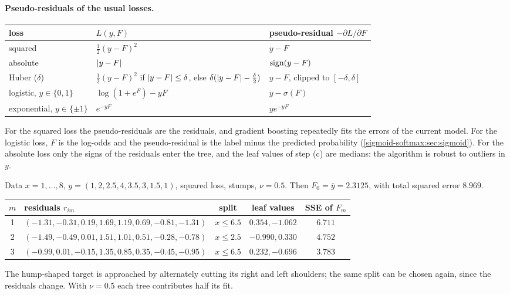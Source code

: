 \begin{notechapter}
\paragraph{Pseudo-residuals of the usual losses.}
\begin{center}
\small
\begin{tabular}{@{}lll@{}}
\toprule
loss & $L(y, F)$ & pseudo-residual $-\partial L/\partial F$ \\
\midrule
squared & $\frac12(y - F)^2$ & $y - F$ \\
absolute & $\left|y - F\right|$ & $\operatorname{sign}(y - F)$ \\
Huber ($\delta$) & $\frac12(y - F)^2$ if $\left|y - F\right|\leq\delta$, else $\delta(\left|y - F\right| - \frac\delta2)$ & $y - F$, clipped to $[-\delta, \delta]$ \\
logistic, $y\in\{0, 1\}$ & $\log(1 + e^F) - yF$ & $y - \sigma(F)$ \\
exponential, $y\in\{\pm1\}$ & $e^{-yF}$ & $ye^{-yF}$ \\
\bottomrule
\end{tabular}
\end{center}
For the squared loss the pseudo-residuals are the residuals, and gradient boosting
repeatedly fits the errors of the current model. For the logistic loss, $F$ is the
log-odds and the pseudo-residual is the label minus the predicted probability
(\cref{sigmoid-softmax:sec:sigmoid}). For the absolute loss only the signs of the residuals
enter the tree, and the leaf values of step (c) are medians: the algorithm is robust to
outliers in $y$.

\begin{example}\label{gradient-boosting:ex:rounds}
Data $x = 1,\dots,8$, $y = (1, 2, 2.5, 4, 3.5, 3, 1.5, 1)$, squared loss, stumps, $\nu = 0.5$. Then $F_0 = \bar y = 2.3125$,
with total squared error $8.969$.
\begin{center}
\begin{tabular}{@{}clccc@{}}
\toprule
$m$ & residuals $r_{im}$ & split & leaf values & SSE of $F_m$ \\
\midrule
1 & $(-1.31, -0.31, 0.19, 1.69, 1.19, 0.69, -0.81, -1.31)$ & $x\leq6.5$ & $0.354, -1.062$ & $6.711$ \\
2 & $(-1.49, -0.49, 0.01, 1.51, 1.01, 0.51, -0.28, -0.78)$ & $x\leq2.5$ & $-0.990, 0.330$ & $4.752$ \\
3 & $(-0.99, 0.01, -0.15, 1.35, 0.85, 0.35, -0.45, -0.95)$ & $x\leq6.5$ & $0.232, -0.696$ & $3.783$ \\
\bottomrule
\end{tabular}
\end{center}
The hump-shaped target is approached by alternately cutting its right and left
shoulders; the same split can be chosen again, since the residuals change. With $\nu = 0.5$
each tree contributes half its fit.
\end{example}


\end{notechapter}
